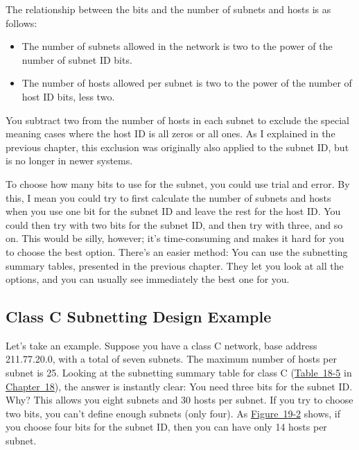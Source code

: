\documentclass[b5paper,11pt]{memoir}
\begin{document}
The relationship between the bits and the number of subnets and hosts is
as follows:

\begin{itemize}
\item
  The number of subnets allowed in the network is two to the power of
  the number of subnet ID bits.
\item
  The number of hosts allowed per subnet is two to the power of the
  number of host ID bits, less two.
\end{itemize}

You subtract two from the number of hosts in each subnet to exclude the
special meaning cases where the host ID is all zeros or all ones. As I
explained in the previous chapter, this exclusion was originally also
applied to the subnet ID, but is no longer in newer systems.

To choose how many bits to use for the subnet, you could use trial and
error. By this, I mean you could try to first calculate the number of
subnets and hosts when you use one bit for the subnet ID and leave the
rest for the host ID. You could then try with two bits for the subnet
ID, and then try with three, and so on. This would be silly, however;
it's time-consuming and makes it hard for you to choose the best option.
There's an easier method: You can use the subnetting summary tables,
presented in the previous chapter. They let you look at all the options,
and you can usually see immediately the best one for you.

\subsection[class C Subnetting Design
Example]{\texorpdfstring{\protect\hypertarget{ch19s02.htmlux5cux23class_c_subnetting_design_example}{}{}Class
C Subnetting Design Example}{class C Subnetting Design Example}}

\protect\hypertarget{ch19s02.htmlux5cux23idx-CHP-19-0748}{}{}Let's take
an example. Suppose you have a class C network, base address
211.77.20.0, with a total of seven subnets. The maximum number of hosts
per subnet is 25. Looking at the subnetting summary table for class C
(\protect\hyperlink{ch18s07.htmlux5cux23subnetting_summary_table_for_class_c_net}{Table~18-5}
in \protect\hyperlink{ch18.html}{Chapter~18}), the answer is instantly
clear: You need three bits for the subnet ID. Why? This allows you eight
subnets and 30 hosts per subnet. If you try to choose two bits, you
can't define enough subnets (only four). As
\protect\hyperlink{ch19s02.htmlux5cux23example_of_class_c_subnetting_in_this_pa}{Figure~19-2}
shows, if you choose four bits for the subnet ID, then you can have only
14 hosts per subnet.
\end{document}

